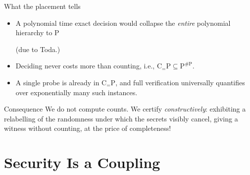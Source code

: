 \documentclass[aspectratio=169,10pt]{beamer}
\newcommand{\CeqP}{\mathrm{C}_{=}\mathrm{P}}
\newcommand{\sharpP}{\#\mathrm{P}}
\begin{document}
\begin{frame}{What the placement tells}
  \begin{itemize}
    \item A polynomial time exact decision would collapse the \emph{entire} polynomial
      hierarchy to $\mathrm{P}$ \\ \hfill \begin{small}(due to Toda.)\end{small}
    \item Deciding never costs more than counting, i.e., $\CeqP \subseteq \mathrm{P}^{\sharpP}$.
    \item A single probe is already in $\CeqP$, and full verification universally
    quantifies over exponentially many such instances.
  \end{itemize}
  \medskip
  \begin{exampleblock}{Consequence}
    We do not compute counts. We certify \emph{constructively}: exhibiting a
    relabelling of the randomness under which the secrets visibly cancel, giving
    a witness without counting, at the price of completeness!
  \end{exampleblock}
\end{frame}

\section{Security Is a Coupling}
\end{document}
